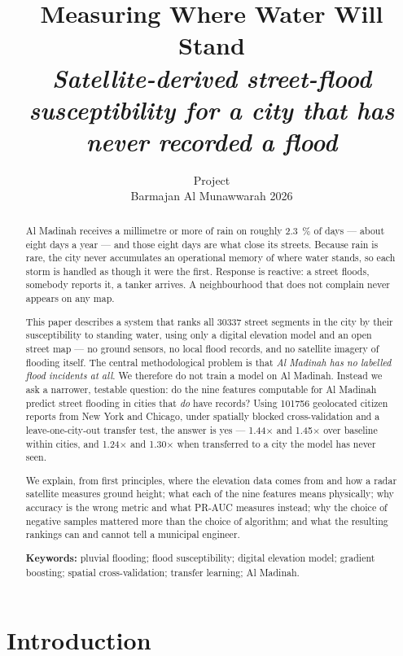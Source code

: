 \documentclass[11pt,a4paper]{article}
\title{\bfseries Measuring Where Water Will Stand\\[4pt]
  \large\normalfont\itshape Satellite-derived street-flood susceptibility
  for a city that has never recorded a flood}
\author{\Mityaf{} Project\\[2pt]
  \small Barmajan Al Munawwarah 2026}
\date{}
\begin{document}
\maketitle

\begin{abstract}
\noindent
Al Madinah receives a millimetre or more of rain on roughly \SI{2.3}{\percent} of days
--- about eight days a year --- and those eight days are what close its streets. Because rain is rare, the
city never accumulates an operational memory of where water stands, so each storm is
handled as though it were the first. Response is reactive: a street floods, somebody
reports it, a tanker arrives. A neighbourhood that does not complain never appears on
any map.

This paper describes a system that ranks all \num{30337} street segments in the city by
their susceptibility to standing water, using only a digital elevation model and an
open street map --- no ground sensors, no local flood records, and no satellite imagery
of flooding itself. The central methodological problem is that \emph{Al Madinah has no
labelled flood incidents at all}. We therefore do not train a model on Al Madinah.
Instead we ask a narrower, testable question: do the nine features computable for
Al Madinah predict street flooding in cities that \emph{do} have records? Using
\num{101756} geolocated citizen reports from New York and Chicago, under spatially
blocked cross-validation and a leave-one-city-out transfer test, the answer is yes ---
\num{1.44}$\times$ and \num{1.45}$\times$ over baseline within cities, and
\num{1.24}$\times$ and \num{1.30}$\times$ when transferred to a city the model has
never seen.

We explain, from first principles, where the elevation data comes from and how a radar
satellite measures ground height; what each of the nine features means physically; why
accuracy is the wrong metric and what PR-AUC measures instead; why the choice of
negative samples mattered more than the choice of algorithm; and what the resulting
rankings can and cannot tell a municipal engineer.

\smallskip
\noindent\textbf{Keywords:} pluvial flooding; flood susceptibility; digital elevation
model; gradient boosting; spatial cross-validation; transfer learning; Al Madinah.
\end{abstract}

\tableofcontents
\newpage

\section{Introduction}\label{sec:intro}
\end{document}
